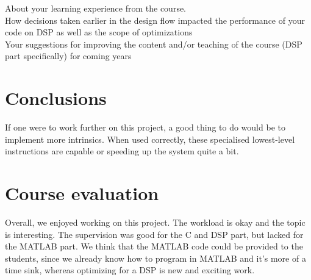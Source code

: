 \documentclass[a4paper]{article}
\begin{document}
About your learning experience from the course.\\
How decisions taken earlier in the design flow impacted the performance of your code on DSP as
well as the scope of optimizations\\
 Your suggestions for improving the content and/or teaching of the course (DSP part specifically) for
coming years

\section{Conclusions}
If one were to work further on this project, a good thing to do would be to implement more intrinsics. When used correctly, these specialised lowest-level instructions are capable or speeding up the system quite a bit.

\section{Course evaluation}
Overall, we enjoyed working on this project. The workload is okay and the topic is interesting. The supervision was good for the C and DSP part, but lacked for the MATLAB part.
We think that the MATLAB code could be provided to the students, since we already know how to program in MATLAB and it's more of a time sink, whereas optimizing for a DSP is new and exciting work.
\end{document}
